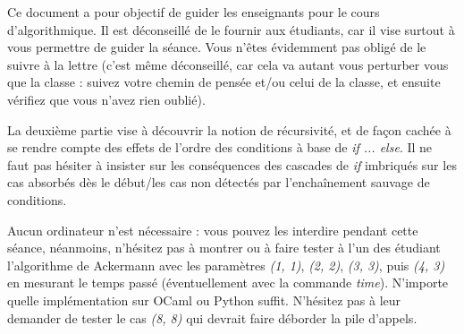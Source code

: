 \documentclass[11pt,a4paper]{article}
\begin{document}
\EncadreTitre

\bigskip


%
%

\bigskip


Ce document a pour objectif de guider les enseignants pour le cours d'algorithmique.
Il est déconseillé de le fournir aux étudiants, car il vise surtout à vous permettre de guider la séance.
Vous n'êtes évidemment pas obligé de le suivre à la lettre (c'est même déconseillé, car cela va autant vous perturber vous que la classe : suivez votre chemin de pensée et/ou celui de la classe, et ensuite vérifiez que vous n'avez rien oublié).

\medskip

La deuxième partie vise à découvrir la notion de récursivité, et de façon cachée à se rendre compte des effets de l'ordre des conditions à base de \textit{if ... else}.
Il ne faut pas hésiter à insister sur les conséquences des cascades de \textit{if} imbriqués sur les cas absorbés dès le début/les cas non détectés par l'enchaînement sauvage de conditions.

Aucun ordinateur n'est nécessaire : vous pouvez les interdire pendant cette séance, néanmoins, n'hésitez pas à montrer ou à faire tester à l'un des étudiant l'algorithme de Ackermann avec les paramètres \textit{(1, 1)}, \textit{(2, 2)}, \textit{(3, 3)}, puis \textit{(4, 3)} en mesurant le temps passé (éventuellement avec la commande \textit{time}).
N'importe quelle implémentation sur OCaml ou Python suffit.
N'hésitez pas à leur demander de tester le cas \textit{(8, 8)} qui devrait faire déborder la pile d'appels.

\bigskip
\end{document}
